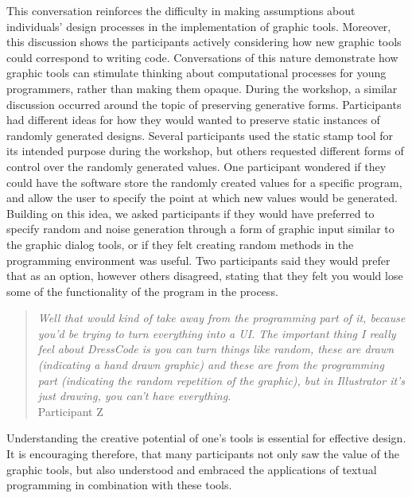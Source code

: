 \documentclass{sigchi}
\begin{document}
This conversation reinforces the difficulty in making assumptions about individuals' design processes in the implementation of graphic tools. Moreover, this discussion shows the participants actively considering how new graphic tools could correspond to writing code. Conversations of this nature demonstrate how graphic tools can stimulate thinking about computational processes for young programmers, rather than making them opaque. During the workshop, a similar discussion occurred around the topic of preserving generative forms. Participants had different ideas for how they would wanted to preserve static instances of randomly generated designs. Several participants used the static stamp tool for its intended purpose during the workshop, but others requested different forms of control over the randomly generated values. One participant wondered if they could have the software store the randomly created values for a specific program, and allow the user to specify the point at which new values would be generated. Building on this idea, we asked participants if they would have preferred to specify random and noise generation through a form of graphic input similar to the graphic dialog tools, or if they felt creating random methods in the programming environment was useful. Two participants said they would prefer that as an option, however others disagreed, stating that they felt you would lose some of the functionality of the program in the process.
\begin{quotation} 
\textit{Well that would kind of take away from the programming part of it, because you'd be trying to turn everything into a UI.
The important thing I really feel about DressCode is you can turn things like random, these are drawn (indicating a hand drawn graphic) and these are from the programming part (indicating the random repetition of the graphic), but in Illustrator it's just drawing, you can't have everything.}
\\Participant Z
\end{quotation}

Understanding the creative potential of one's tools is essential for effective design. It is encouraging therefore, that many participants not only saw the value of the graphic tools, but also understood and embraced the applications of textual programming in combination with these tools. 
\end{document}
